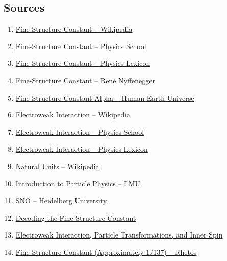 \documentclass{article}
\begin{document}
	\subsection*{Sources}
	\begin{enumerate}
		\item \href{https://en.wikipedia.org/wiki/Fine-structure_constant}{Fine-Structure Constant – Wikipedia}
		\item \href{https://www.cosmos-indirekt.de/Physik-Schule/Feinstrukturkonstante}{Fine-Structure Constant – Physics School}
		\item \href{https://www.spektrum.de/lexikon/physik/feinstrukturkonstante/4829}{Fine-Structure Constant – Physics Lexicon}
		\item \href{https://renenyffenegger.ch/notes/Wissenschaft/Physik/Konstanten/Feinstrukturkonstante}{Fine-Structure Constant – René Nyffenegger}
		\item \href{https://mensch-erde-universum.de/feinstrukturkonstante/}{Fine-Structure Constant Alpha – Human-Earth-Universe}
		\item \href{https://en.wikipedia.org/wiki/Electroweak_interaction}{Electroweak Interaction – Wikipedia}
		\item \href{https://www.cosmos-indirekt.de/Physik-Schule/Elektroschwache_Wechselwirkung}{Electroweak Interaction – Physics School}
		\item \href{https://www.spektrum.de/lexikon/physik/elektroschwache-wechselwirkung/4197}{Electroweak Interaction – Physics Lexicon}
		\item \href{https://en.wikipedia.org/wiki/Natural_units}{Natural Units – Wikipedia}
		\item \href{https://www-static.etp.physik.uni-muenchen.de/fp-versuch/node5.html}{Introduction to Particle Physics – LMU}
		\item \href{https://www.thphys.uni-heidelberg.de/~wolschin/alpha.html}{SNO – Heidelberg University}
		\item \href{https://vixra.org/pdf/1408.0018vM.pdf}{Decoding the Fine-Structure Constant}
		\item \href{https://nsosp.org/en/Quantum-Flux-Theory/Electroweak-Interaction-Particle-Transformations-Weak-Isospin_en.php}{Electroweak Interaction, Particle Transformations, and Inner Spin}
		\item \href{https://www.rhetos.de/html/lex/feinstrukturkonstante.htm}{Fine-Structure Constant (Approximately 1/137) – Rhetos}
	\end{enumerate}
	
\end{document}
